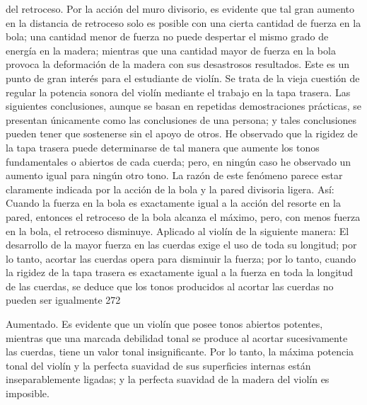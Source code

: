 del retroceso. Por la acción del muro divisorio, es evidente que tal gran aumento en la distancia de retroceso solo es posible con una cierta cantidad de fuerza en la bola; una cantidad menor de fuerza no puede despertar el mismo grado de energía en la madera; mientras que una cantidad mayor de fuerza en la bola provoca la deformación de la madera con sus desastrosos resultados.
Este es un punto de gran interés para el estudiante de violín.
Se trata de la vieja cuestión de regular la potencia sonora del violín mediante el trabajo en la tapa trasera. Las siguientes conclusiones, aunque se basan en repetidas demostraciones prácticas, se presentan únicamente como las conclusiones de una persona; y tales conclusiones pueden tener que sostenerse sin el apoyo de otros. He observado que la rigidez de la tapa trasera puede determinarse de tal manera que aumente los tonos fundamentales o abiertos de cada cuerda; pero, en ningún caso he observado un aumento igual para ningún otro tono. La razón de este fenómeno parece estar claramente indicada por la acción de la bola y la pared divisoria ligera. Así: Cuando la fuerza en la bola es exactamente igual a la acción del resorte en la pared, entonces el retroceso de la bola alcanza el máximo, pero, con menos fuerza en la bola, el retroceso disminuye. Aplicado al violín de la siguiente manera: El desarrollo de la mayor fuerza en las cuerdas exige el uso de toda su longitud; por lo tanto, acortar las cuerdas opera para disminuir la fuerza; por lo tanto, cuando la rigidez de la tapa trasera es exactamente igual a la fuerza en toda la longitud de las cuerdas, se deduce que los tonos producidos al acortar las cuerdas no pueden ser igualmente
272

Aumentado. Es evidente que un violín que posee tonos abiertos potentes, mientras que una marcada debilidad tonal se produce al acortar sucesivamente las cuerdas, tiene un valor tonal insignificante. Por lo tanto, la máxima potencia tonal del violín y la perfecta suavidad de sus superficies internas están inseparablemente ligadas; y la perfecta suavidad de la madera del violín es imposible.
